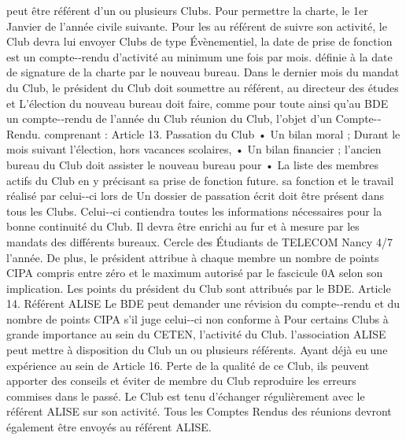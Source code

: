 \documentclass{article} %
\begin{document}
\begin{multicols}{2}
peut  être  référent  d’un  ou  plusieurs  Clubs.  Pour  permettre   la  charte,  le  1er  Janvier  de  l’année  civile  suivante.  Pour  les  
au  référent  de  suivre  son  activité,  le  Club  devra  lui  envoyer   Clubs  de  type  Évènementiel,  la  date  de  prise  de  fonction  est  
un  compte-­‐rendu  d’activité  au  minimum  une  fois  par  mois.   définie   à   la   date   de   signature   de   la   charte   par   le   nouveau   bureau.    
Dans   le   dernier   mois   du   mandat   du   Club,   le   président   du   Club  doit  soumettre  au  référent,  au  directeur  des  études  et   L’élection  du  nouveau  bureau  doit  faire,  comme  pour  toute  
ainsi   qu’au   BDE   un   compte-­‐rendu   de   l’année   du   Club   réunion  du  Club,  l’objet  d’un  Compte-­‐Rendu.  
comprenant  :  
Article  13. Passation  du  Club  
• Un  bilan  moral  ;   Durant   le   mois   suivant   l’élection,   hors   vacances   scolaires,  
• Un  bilan  financier  ;   l’ancien  bureau  du  Club  doit  assister  le  nouveau  bureau  pour  
• La  liste  des  membres  actifs  du  Club  en  y  précisant   sa  prise  de  fonction  future.  
sa  fonction  et  le  travail  réalisé  par  celui-­‐ci  lors  de  
Un  dossier  de  passation  écrit  doit  être  présent  dans  tous  les   Clubs.   Celui-­‐ci   contiendra   toutes   les   informations   nécessaires  pour  la  bonne  continuité  du  Club.  Il  devra  être   enrichi   au   fur   et   à   mesure   par   les   mandats   des   différents   bureaux.  
                  Cercle  des  Étudiants  de  TELECOM  Nancy   4/7   l’année.   De   plus,   le   président   attribue   à   chaque   membre  un  nombre  de  points  CIPA  compris  entre   zéro   et   le   maximum   autorisé   par   le   fascicule   0A   selon   son   implication.   Les   points   du   président   du   Club  sont  attribués  par  le  BDE.  
Article  14. Référent  ALISE  
Le  BDE  peut  demander  une  révision  du  compte-­‐rendu  et  du   nombre   de   points   CIPA   s’il   juge   celui-­‐ci   non   conforme   à   Pour  certains  Clubs  à  grande  importance  au  sein  du  CETEN,  
l’activité  du  Club.   l’association  ALISE  peut  mettre  à  disposition  du  Club  un  ou   plusieurs  référents.  Ayant  déjà  eu  une  expérience  au  sein  de  
Article  16. Perte   de   la   qualité   de   ce   Club,   ils   peuvent   apporter   des   conseils   et   éviter   de  
membre  du  Club   reproduire  les  erreurs  commises  dans  le  passé.  Le  Club  est   tenu   d’échanger   régulièrement   avec   le   référent   ALISE   sur   son  activité.  Tous  les  Comptes  Rendus  des  réunions  devront   également  être  envoyés  au  référent  ALISE.  

\end{multicols}
\end{document}
